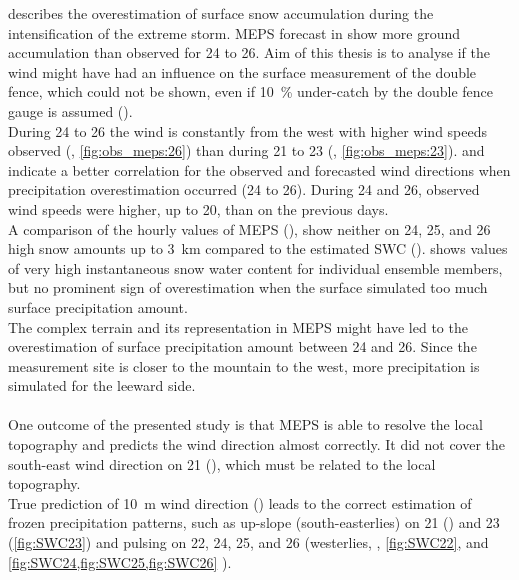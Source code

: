 \noindent
 describes the overestimation of surface snow accumulation during the intensification of the extreme storm. MEPS forecast in  show more ground accumulation than observed for \num{24} to \SI{26}{\dec}. Aim of this thesis is to analyse if the wind might have had an influence on the surface measurement of the double fence, which could not be shown, even if \SI{10}{\percent} under-catch by the double fence gauge is assumed ().
\\
During \num{24} to \SI{26}{\dec} the wind is constantly from the west with higher wind speeds observed (, \ref{fig:obs_meps:26}) than during \num{21} to \SI{23}{\dec} (, \ref{fig:obs_meps:23}).  and  indicate a better correlation for the observed and forecasted wind directions when precipitation overestimation occurred (\num{24} to \SI{26}{\dec}). During \num{24} and \SI{26}{\dec}, observed wind speeds were higher, up to \SI{20}{\mPs}, than on the previous days.
\\
A comparison of the hourly values of MEPS (), show neither on \num{24}, \num{25}, and \SI{26}{\dec} high snow amounts up to \SI{3}{\km} compared to the estimated SWC ().  shows values of very high instantaneous snow water content for individual ensemble members, but no prominent sign of overestimation when the surface %
simulated too much surface precipitation amount.
\\
The complex terrain and its representation in MEPS might have led to the overestimation of surface precipitation amount between \num{24} and \SI{26}{\dec}. Since the measurement site is closer to the mountain to the west, more precipitation is simulated for the leeward side.
\\
\\
One outcome of the presented study is that MEPS is able to resolve the local topography and predicts the wind direction almost correctly.  It did not cover the south-east wind direction on \SI{21}{\dec} (), which must be related to the local topography. 
\\
True prediction of \SI{10}{\metre} wind direction () leads to the correct estimation of frozen precipitation patterns, such as up-slope (south-easterlies) on \num{21} () and \SI{23}{\dec} (\ref{fig:SWC23}) and pulsing on \num{22}, \num{24}, \num{25}, and \SI{26}{\dec} (westerlies, , \ref{fig:SWC22}, and \ref{fig:SWC24,fig:SWC25,fig:SWC26} ). 
